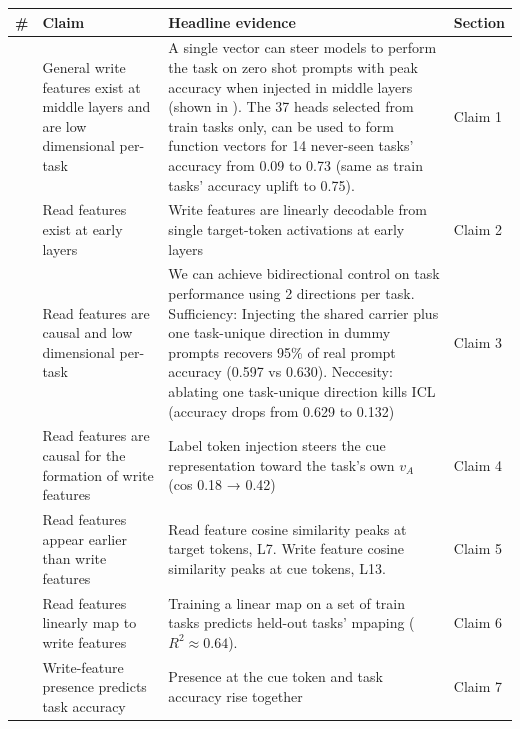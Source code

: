 \documentclass{article}
\renewcommand{\_}{\textunderscore\allowbreak}
\begin{document}
{\def\LTcaptype{none} %
\begin{longtable}[]{@{}
  >{\raggedright\arraybackslash}p{}
  >{\raggedright\arraybackslash}p{}
  >{\raggedright\arraybackslash}p{}
  >{\raggedright\arraybackslash}p{}@{}}
\toprule\noalign{}
\begin{minipage}[b]{\linewidth}\raggedright
\#
\end{minipage} & \begin{minipage}[b]{\linewidth}\raggedright
Claim
\end{minipage} & \begin{minipage}[b]{\linewidth}\raggedright
Headline evidence
\end{minipage} & \begin{minipage}[b]{\linewidth}\raggedright
Section
\end{minipage} \\
\midrule\noalign{}
\endhead
\bottomrule\noalign{}
\endlastfoot
1 & General write features exist at middle layers and are low dimensional per-task & A single vector can steer models to perform the task on zero shot prompts with peak accuracy when injected in middle layers (shown in \citealt{todd2024function}). The 37 heads selected from train tasks only, can be used to form function vectors for 14 never-seen tasks' accuracy from 0.09 to 0.73 (same as train tasks' accuracy uplift to 0.75). & Claim 1 \\
2 & Read features exist at early layers & Write features are linearly decodable from single target-token activations at early layers & Claim 2 \\
3 & Read features are causal and low dimensional per-task & We can achieve bidirectional control on task performance using 2 directions per task. Sufficiency: Injecting the shared carrier plus one task-unique direction in dummy prompts recovers 95\% of real prompt accuracy (0.597 vs 0.630). Neccesity: ablating one task-unique direction kills ICL (accuracy drops from 0.629 to 0.132) & Claim 3 \\
4 & Read features are causal for the formation of write features & Label token injection steers the cue representation toward the task's own \(v_A\) (cos 0.18 → 0.42) & Claim 4 \\
5 & Read features appear earlier than write features & Read feature cosine similarity peaks at target tokens, L7. Write feature cosine similarity peaks at cue tokens, L13. & Claim 5 \\
6 & Read features linearly map to write features & Training a linear map on a set of train tasks predicts held-out tasks' mpaping (\(R^2 \approx 0.64\)). & Claim 6 \\
7 & Write-feature presence predicts task accuracy & Presence at the cue token and task accuracy rise together & Claim 7 \\
\end{longtable}
}
\end{document}
